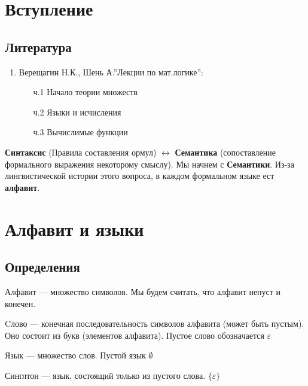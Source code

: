 
\section{Вступление}
\subsection{Литература}
\begin{enumerate}
    \item Верещагин Н.К., Шень А.''Лекции по мат.логике'':
    \begin{enumerate}
        \item[ч.1] Начало теории множеств
        \item[ч.2] Языки и исчисления
        \item[ч.3] Вычислимые функции
    \end{enumerate}
\end{enumerate}

\textbf{Синтаксис} (Правила составления ормул) $\longleftrightarrow$ \textbf{Семантика} (сопоставление формального выражения некоторому смыслу).
Мы начнем с \textbf{Семантики}. Из-за лингвистической истории этого вопроса, в каждом формальном языке ест \textbf{алфавит}.

\section{Алфавит и языки}
\subsection{Определения}
\begin{definition}
    Алфавит --- множество символов. Мы будем считать, что алфавит непуст и конечен.
\end{definition}

\begin{definition}
    Cлово --- конечная последовательность символов алфавита (может быть пустым). Оно состоит из букв (элементов алфавита). Пустое слово обозначается $\varepsilon$
\end{definition}

\begin{definition}
    Язык --- множество слов. Пустой язык $\emptyset$
\end{definition}

\begin{definition}
    Синглтон --- язык, состоящий только из пустого слова. $\{\varepsilon\}$
\end{definition}

